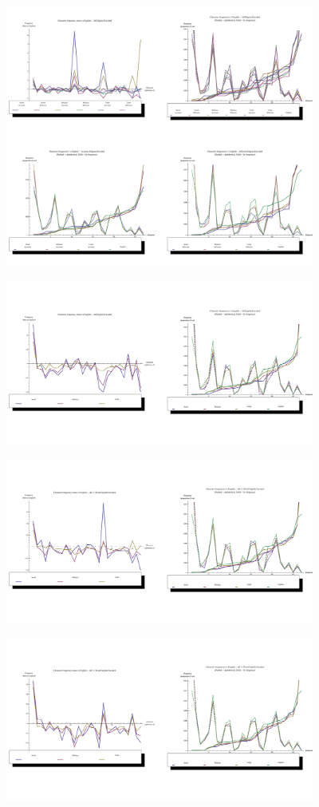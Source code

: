 \documentclass[12pt]{report}
\theoremstyle{remark}
\theoremstyle{definition}
\theoremstyle{definition}
\theoremstyle{definition}
\begin{document}
\begin{figure}
\centering
\includegraphics[width=4in]{figures/plots_digram.pdf}
\end{figure}
\begin{figure}
\centering
\includegraphics[width=4in]{figures/plots_markov1.pdf}
\end{figure}
\begin{figure}
\centering
\includegraphics[width=4in]{figures/plots_markov2.pdf}
\end{figure}
\begin{figure}
\centering
\includegraphics[width=4in]{figures/plots_markov3.pdf}
\end{figure}
\end{document}
